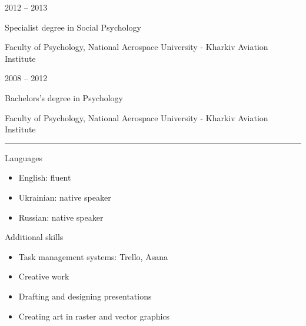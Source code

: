 \documentclass[a4paper,10pt]{article}
\newlength{\cvcolumngapwidth}
\newlength{\cvleftcolumnwidth}
\newlength{\cvrightcolumnwidth}
\newcommand{\cvsectionstyle}[1]{{\normalsize\cvsectionfont\textcolor{cvsectioncolor}{#1}}}
\newcommand{\cvtitlestyle}[1]{{\large\cvtitlefont\textcolor{cvtitlecolor}{#1}}}
\newcommand{\cvdurationstyle}[1]{{\small\cvdurationfont\textcolor{cvdurationcolor}{#1}}}
\newcommand{\cvheadingstyle}[1]{{\normalsize\cvheadingfont\textcolor{cvheadingcolor}{#1}}}
\newlength{\cvafteritemskipamount}
\newlength{\cvaftersectionskipamount}
\newlength{\cvbetweensectionandheadingextraskipamount}
\newlength{\cvaftertitleskipamount}
\newlength{\cvparskip}
\newcommand{\cvsection}[1]{
\begin{minipage}[t]{\cvleftcolumnwidth}
    \raggedleft\cvsectionstyle{#1}
\end{minipage}%
\hspace{\cvcolumngapwidth}%
\begin{minipage}[t]{\cvrightcolumnwidth}
    \textcolor{cvrulecolor}{\rule{\cvrightcolumnwidth}{0.3mm}}
\end{minipage}

\vspace{\cvaftersectionskipamount}
}
\newcommand{\cvitem}[2]{
\begin{minipage}[t]{\cvleftcolumnwidth}
    \raggedleft #1
\end{minipage}%
\hspace{\cvcolumngapwidth}%
\begin{minipage}[t]{\cvrightcolumnwidth}
    \setlength{\parskip}{\cvparskip} #2
\end{minipage}

\vspace{\cvafteritemskipamount}
}
\newcommand{\cvtitle}[1]{
\cvtitlestyle{#1}

\vspace{\cvaftertitleskipamount}
\vspace{-\cvparskip}
}
\begin{document}
\cvitem{
\cvdurationstyle{2012 -- 2013}
}{
\cvtitle{Specialist degree in Social Psychology}

Faculty of Psychology, National Aerospace University - Kharkiv Aviation Institute
}

\cvitem{
\cvdurationstyle{2008 -- 2012}
}{
\cvtitle{Bachelors's degree in Psychology}

Faculty of Psychology, National Aerospace University - Kharkiv Aviation Institute
}



\cvsection{SKILLS}

\vspace{\cvbetweensectionandheadingextraskipamount}

\cvitem{
\cvheadingstyle{Languages}
}{
    \begin{itemize}
        \item \cvsectionstyle{English}: fluent 
        \item \cvsectionstyle{Ukrainian}: native speaker
        \item \cvsectionstyle{Russian}: native speaker
    \end{itemize}
}

\cvitem{
\cvheadingstyle{Additional skills}
}{
    \begin{itemize}
        \item Task management systems: Trello, Asana
        
        \item Creative work
        
        \item Drafting and designing presentations
        
        \item Creating art in raster and vector graphics
    \end{itemize}

}










\end{document}
